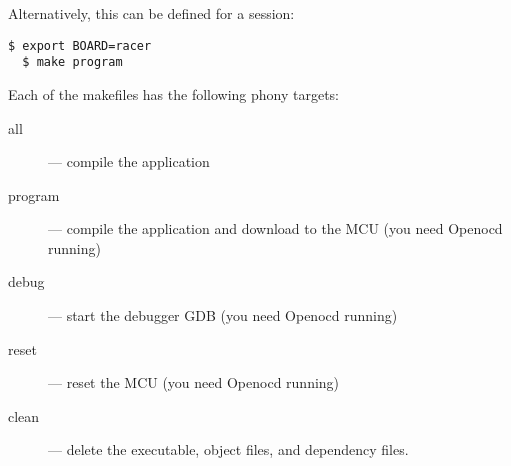 Alternatively, this can be defined for a session:
%
\begin{verbatim}
$ export BOARD=racer
  $ make program
\end{verbatim}


Each of the makefiles has the following phony targets:
%
\begin{description}
\item[all]  --- compile the application
\item[program] --- compile the application and download to the MCU (you need Openocd running)
\item[debug] --- start the debugger GDB (you need Openocd running)  
\item[reset] --- reset the MCU (you need Openocd running)
\item[clean] --- delete the executable, object files, and dependency files.
\end{description}

